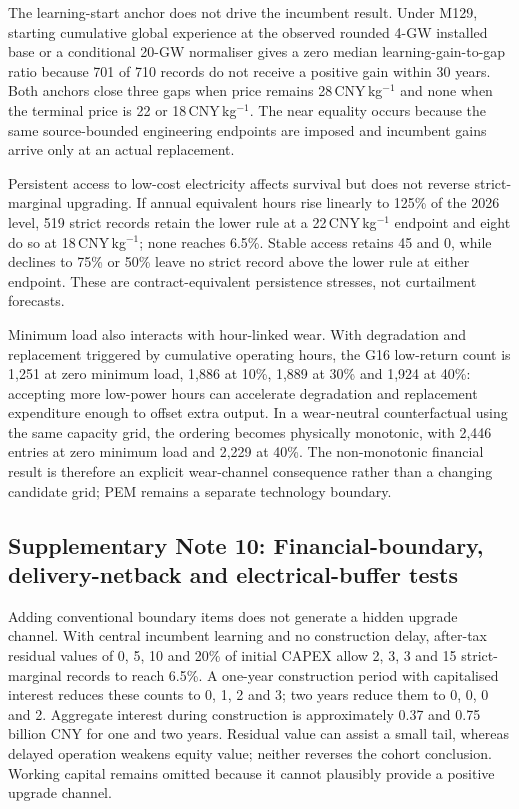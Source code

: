 \documentclass[pdflatex,sn-nature]{sn-jnl}
\begin{document}
The learning-start anchor does not drive the incumbent result. Under M129, starting cumulative global experience at the observed rounded 4-GW installed base or a conditional 20-GW normaliser gives a zero median learning-gain-to-gap ratio because 701 of 710 records do not receive a positive gain within 30 years. Both anchors close three gaps when price remains 28\,CNY\,kg$^{-1}$ and none when the terminal price is 22 or 18\,CNY\,kg$^{-1}$. The near equality occurs because the same source-bounded engineering endpoints are imposed and incumbent gains arrive only at an actual replacement.

Persistent access to low-cost electricity affects survival but does not reverse strict-marginal upgrading. If annual equivalent hours rise linearly to 125\% of the 2026 level, 519 strict records retain the lower rule at a 22\,CNY\,kg$^{-1}$ endpoint and eight do so at 18\,CNY\,kg$^{-1}$; none reaches 6.5\%. Stable access retains 45 and 0, while declines to 75\% or 50\% leave no strict record above the lower rule at either endpoint. These are contract-equivalent persistence stresses, not curtailment forecasts.

Minimum load also interacts with hour-linked wear. With degradation and replacement triggered by cumulative operating hours, the G16 low-return count is 1,251 at zero minimum load, 1,886 at 10\%, 1,889 at 30\% and 1,924 at 40\%: accepting more low-power hours can accelerate degradation and replacement expenditure enough to offset extra output. In a wear-neutral counterfactual using the same capacity grid, the ordering becomes physically monotonic, with 2,446 entries at zero minimum load and 2,229 at 40\%. The non-monotonic financial result is therefore an explicit wear-channel consequence rather than a changing candidate grid; PEM remains a separate technology boundary.

\subsection*{Supplementary Note 10: Financial-boundary, delivery-netback and electrical-buffer tests}

Adding conventional boundary items does not generate a hidden upgrade channel. With central incumbent learning and no construction delay, after-tax residual values of 0, 5, 10 and 20\% of initial CAPEX allow 2, 3, 3 and 15 strict-marginal records to reach 6.5\%. A one-year construction period with capitalised interest reduces these counts to 0, 1, 2 and 3; two years reduce them to 0, 0, 0 and 2. Aggregate interest during construction is approximately 0.37 and 0.75\,billion CNY for one and two years. Residual value can assist a small tail, whereas delayed operation weakens equity value; neither reverses the cohort conclusion. Working capital remains omitted because it cannot plausibly provide a positive upgrade channel.
\end{document}
